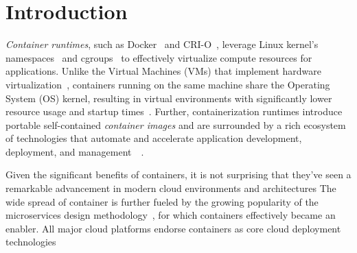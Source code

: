 \section{Introduction}
\label{sec:intro}

%
%
%
%
%
%
%




\emph{Container runtimes}, such as Docker~\cite{docker} and
\mbox{CRI-O}~\cite{cri-o}, leverage Linux kernel's namespaces~\cite{namespaces}
and cgroups~\cite{cgroups}
to effectively virtualize compute resources for applications.
%
Unlike the Virtual Machines (VMs) that implement hardware
virtualization~\cite{adams2006comparison}, containers running on the same
machine share the Operating System (OS) kernel, resulting in virtual
environments with significantly lower resource usage and startup
times~\cite{7819678}.
%
Further, containerization runtimes introduce portable self-contained \emph{container
images} and are surrounded by a rich ecosystem of technologies that automate and
accelerate application development, deployment, and
management~\cite{kubernetes}~.

Given the significant benefits of containers, it is not surprising that they've
seen a remarkable advancement in modern cloud environments and architectures
%
The wide spread of container is further fueled by the growing popularity of the
microservices design methodology~, for which containers effectively
became an enabler.
%
All major cloud platforms endorse containers as core cloud deployment
technologies~\cite{googlecengine,azurec,ibmkube,awscont} 



